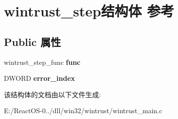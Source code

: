 \hypertarget{structwintrust__step}{}\section{wintrust\+\_\+step结构体 参考}
\label{structwintrust__step}
\subsection*{Public 属性}
\begin{DoxyCompactItemize}
\item 
\mbox{\label{structwintrust__step_a34d0eeab5ef6c068a8208b785aff9662}} 
wintrust\+\_\+step\+\_\+func {\bfseries func}
\item 
\mbox{\label{structwintrust__step_a7738023d3937d9573e64b3343d1506f5}} 
D\+W\+O\+RD {\bfseries error\+\_\+index}
\end{DoxyCompactItemize}


该结构体的文档由以下文件生成\+:\begin{DoxyCompactItemize}
\item 
E\+:/\+React\+O\+S-\/0../dll/win32/wintrust/wintrust\+\_\+main.\+c\end{DoxyCompactItemize}

